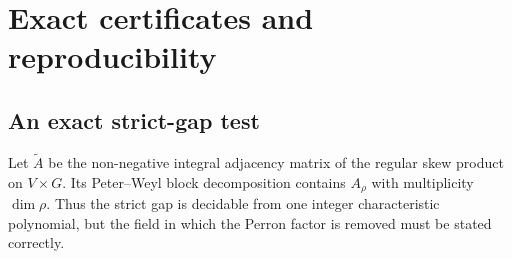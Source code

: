 \section{Exact certificates and reproducibility}\label{sec:exactness}

\subsection{An exact strict-gap test}

Let \(\widetilde A\) be the non-negative integral adjacency matrix of the
regular skew product on \(V\times G\).  Its Peter--Weyl block decomposition
contains \(A_\rho\) with multiplicity \(\dim\rho\).  Thus the strict gap is
decidable from one integer characteristic polynomial, but the field in which
the Perron factor is removed must be stated correctly.

